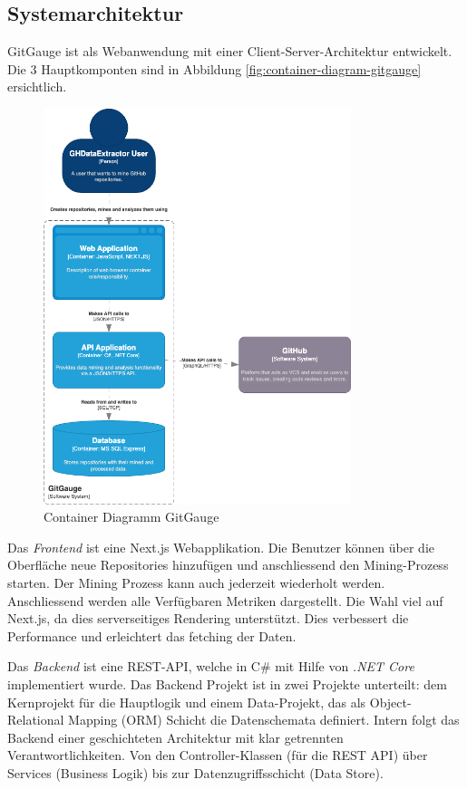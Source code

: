 \subsection{Systemarchitektur}
GitGauge ist als Webanwendung mit einer Client-Server-Architektur entwickelt. Die 3 Hauptkomponten sind in Abbildung \autoref{fig:container-diagram-gitgauge} ersichtlich. 
\begin{figure}[htbp]
    \centering
        \includegraphics[width=0.8\textwidth]{Figures/container-diagram-gitgauge.png}
    \caption{Container Diagramm GitGauge \parencite{grand_joel_vt1_joelgrand_repository_2024}}
    \label{fig:container-diagram-gitgauge}
\end{figure}

Das \textit{Frontend} ist eine Next.js Webapplikation. Die Benutzer können über die Oberfläche neue Repositories hinzufügen und anschliessend den Mining-Prozess starten. Der Mining Prozess kann auch jederzeit wiederholt werden. Anschliessend werden alle Verfügbaren Metriken dargestellt. Die Wahl viel auf Next.js, da dies serverseitiges Rendering unterstützt. Dies verbessert die Performance und erleichtert das fetching der Daten. \parencite{grand_joel_vt1_joelgrand_repository_2024}

Das \textit{Backend} ist eine REST-API, welche in C\# mit Hilfe von \textit{.NET Core} implementiert wurde. Das Backend Projekt ist in zwei Projekte unterteilt: dem Kernprojekt für die Hauptlogik und einem Data-Projekt, das als Object-Relational Mapping (ORM) Schicht die Datenschemata definiert. Intern folgt das Backend einer geschichteten Architektur mit klar getrennten Verantwortlichkeiten. Von den Controller-Klassen (für die REST API) über Services (Business Logik) bis zur Datenzugriffsschicht (Data Store). \parencite{grand_joel_vt1_joelgrand_repository_2024}

